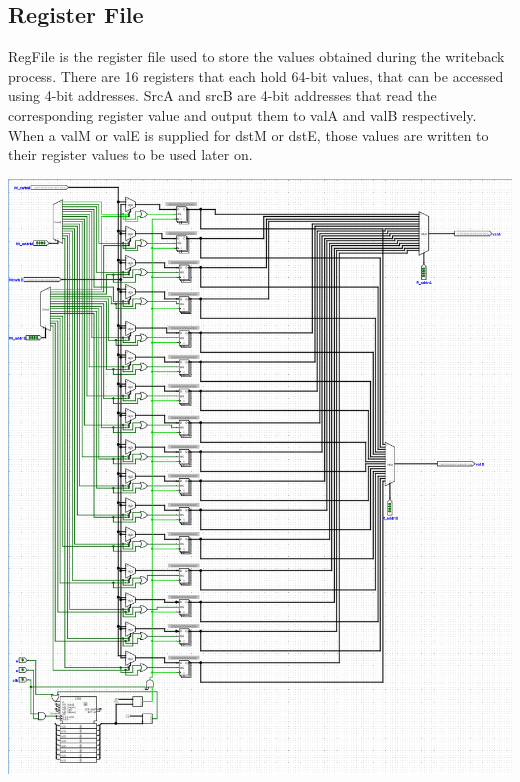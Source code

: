 \documentclass{article}
\begin{document}
\subsection{Register File}
RegFile is the register file used to store the values obtained during the writeback process. There are 16 registers that each hold 64-bit values, that can be accessed using 4-bit addresses. SrcA and srcB are 4-bit addresses that read the corresponding register value and output them to valA and valB respectively. When a valM or valE is supplied for dstM or dstE, those values are written to their register values to be used later on. 
\begin{center}
    \includegraphics[scale=.6]{regFile.png} \\
\end{center}
\pagebreak
\end{document}
